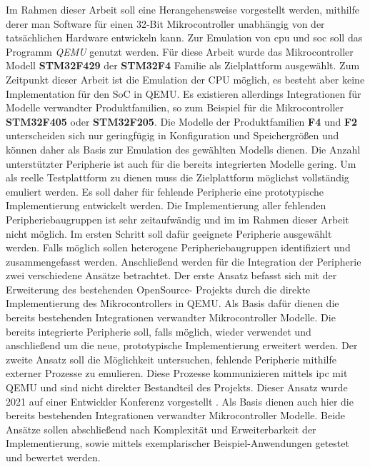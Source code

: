 Im Rahmen dieser Arbeit soll eine Herangehensweise vorgestellt werden, mithilfe
derer man Software für einen 32-Bit Mikrocontroller unabhängig von der
tatsächlichen Hardware entwickeln kann.
Zur Emulation von \acs{cpu} und \acs{soc} soll
das Programm \textit{QEMU} genutzt werden.\newline
Für diese Arbeit wurde das Mikrocontroller Modell \textbf{STM32F429} der
\textbf{STM32F4} Familie als Zielplattform ausgewählt.
Zum Zeitpunkt dieser Arbeit ist die Emulation der CPU möglich, es besteht aber
keine Implementation für den SoC in QEMU.
Es existieren allerdings Integrationen für Modelle verwandter Produktfamilien,
so zum Beispiel für die Mikrocontroller \textbf{STM32F405} oder
\textbf{STM32F205}\cite{QemuSTMDoku}.
Die Modelle der Produktfamilien \textbf{F4} und \textbf{F2} unterscheiden sich
nur geringfügig in Konfiguration und Speichergrößen und können daher als Basis
zur Emulation des gewählten Modells dienen.
Die Anzahl unterstützter Peripherie ist auch für die bereits integrierten
Modelle gering.
Um als reelle Testplattform zu dienen muss die Zielplattform möglichst
vollständig emuliert werden.\newline
Es soll daher für fehlende Peripherie eine prototypische Implementierung
entwickelt werden.
Die Implementierung aller fehlenden Peripheriebaugruppen ist sehr zeitaufwändig
und im im Rahmen dieser Arbeit nicht möglich.
Im ersten Schritt soll dafür geeignete Peripherie ausgewählt werden.
Falls möglich sollen heterogene Peripheriebaugruppen identifiziert und
zusammengefasst werden.
Anschließend werden für die Integration der Peripherie zwei verschiedene
Ansätze betrachtet.\newline
Der erste Ansatz befasst sich mit der Erweiterung des bestehenden OpenSource-
Projekts durch die direkte Implementierung des Mikrocontrollers in QEMU.
Als Basis dafür dienen die bereits bestehenden Integrationen verwandter
Mikrocontroller Modelle.
Die bereits integrierte Peripherie soll, falls möglich, wieder verwendet und
anschließend um die neue, prototypische Implementierung erweitert
werden.\newline
Der zweite Ansatz soll die Möglichkeit untersuchen, fehlende Peripherie
mithilfe externer Prozesse zu emulieren.
Diese Prozesse kommunizieren mittels \acs{ipc} mit QEMU und sind
nicht direkter Bestandteil des Projekts.
Dieser Ansatz wurde 2021 auf einer Entwickler Konferenz vorgestellt
\cite{KplCodeDive}.
Als Basis dienen auch hier die bereits bestehenden Integrationen verwandter
Mikrocontroller Modelle.
Beide Ansätze sollen abschließend nach Komplexität und Erweiterbarkeit der
Implementierung, sowie mittels exemplarischer Beispiel-Anwendungen getestet und
bewertet werden.

